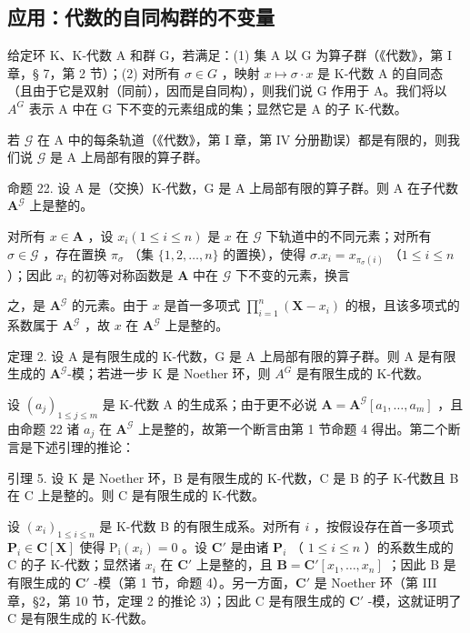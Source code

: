 \subsection{应用：代数的自同构群的不变量}

给定环 K、K-代数 A 和群 G，若满足：(1) 集 A 以 G 为算子群（《代数》，第 I 章，§ 7，第 2 节）；(2) 对所有 \(\sigma \in G\) ，映射 \(x \mapsto \sigma \cdot x\) 是 K-代数 A 的自同态（且由于它是双射（同前），因而是自同构），则我们说 G 作用于 A。我们将以 \(A^{G}\) 表示 A 中在 G 下不变的元素组成的集；显然它是 A 的子 K-代数。

若 \(\mathcal{G}\) 在 A 中的每条轨道（《代数》，第 I 章，第 IV 分册勘误）都是有限的，则我们说 \(\mathcal{G}\) 是 A 上局部有限的算子群。

命题 22. 设 A 是（交换）K-代数，G 是 A 上局部有限的算子群。则 A 在子代数 \(\mathbf{A}^{\mathcal{G}}\) 上是整的。

对所有 \(x \in \mathbf{A}\) ，设 \(x_{i} (1 \leqslant i \leqslant n)\) 是 \(x\) 在 \(\mathcal{G}\) 下轨道中的不同元素；对所有 \(\sigma \in \mathcal{G}\) ，存在置换 \(\pi_{\sigma}\) （集 \(\{1, 2, \ldots, n\}\) 的置换），使得 \(\sigma. x_{i} = x_{\pi_{\sigma}(i)}\) （\(1 \leqslant i \leqslant n\)）；因此 \(x_{i}\) 的初等对称函数是 \(\mathbf{A}\) 中在 \(\mathcal{G}\) 下不变的元素，换言

之，是 \(\mathbf{A}^{\mathcal{G}}\) 的元素。由于 \(x\) 是首一多项式 \(\prod_{i=1}^{n} (\mathbf{X} - x_i)\) 的根，且该多项式的系数属于 \(\mathbf{A}^{\mathcal{G}}\) ，故 \(x\) 在 \(\mathbf{A}^{\mathcal{G}}\) 上是整的。

定理 2. 设 A 是有限生成的 K-代数，G 是 A 上局部有限的算子群。则 A 是有限生成的 \(\mathbf{A}^{\mathcal{G}}\)-模；若进一步 K 是 Noether 环，则 \(A^{G}\) 是有限生成的 K-代数。

设 \((a_{j})_{1\leqslant j\leqslant m}\) 是 K-代数 A 的生成系；由于更不必说 \(\mathbf{A} = \mathbf{A}^{\mathcal{G}}[a_1,\ldots ,a_m]\) ，且由命题 22 诸 \(a_{j}\) 在 \(\mathbf{A}^{\mathcal{G}}\) 上是整的，故第一个断言由第 1 节命题 4 得出。第二个断言是下述引理的推论：

引理 5. 设 K 是 Noether 环，B 是有限生成的 K-代数，C 是 B 的子 K-代数且 B 在 C 上是整的。则 C 是有限生成的 K-代数。

设 \((x_{i})_{1\leqslant i\leqslant n}\) 是 K-代数 B 的有限生成系。对所有 \(i\) ，按假设存在首一多项式 \(\mathbf{P}_i\in \mathbf{C}[\mathbf{X}]\) 使得 \(\mathrm{P_i}(x_i) = 0\) 。设 \(\mathbf{C}'\) 是由诸 \(\mathbf{P}_i\) （ \(1\leqslant i\leqslant n\) ）的系数生成的 C 的子 K-代数；显然诸 \(x_{i}\) 在 \(\mathbf{C}'\) 上是整的，且 \(\mathbf{B} = \mathbf{C}'[x_1,\dots,x_n]\) ；因此 B 是有限生成的 \(\mathbf{C}'\) -模（第 1 节，命题 4）。另一方面，\(\mathbf{C}'\) 是 Noether 环（第 III 章，§2，第 10 节，定理 2 的推论 3）；因此 C 是有限生成的 \(\mathbf{C}'\) -模，这就证明了 C 是有限生成的 K-代数。


